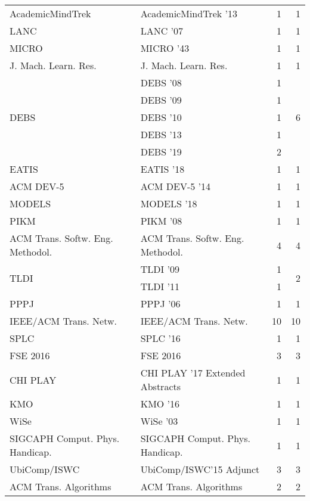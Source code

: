 \begin{table*}[t]
\begin{tabular}{llrr}
\multirow{1}{*}{AcademicMindTrek } & AcademicMindTrek '13 & 1 & \multirow{1}{*}{1}\\
\multirow{1}{*}{LANC } & LANC '07 & 1 & \multirow{1}{*}{1}\\
\multirow{1}{*}{MICRO } & MICRO '43 & 1 & \multirow{1}{*}{1}\\
\multirow{1}{*}{J. Mach. Learn. Res.} & J. Mach. Learn. Res. & 1 & \multirow{1}{*}{1}\\
\multirow{5}{*}{DEBS } & DEBS '08 & 1 & \multirow{5}{*}{6}\\
& DEBS '09 & 1 &\\
& DEBS '10 & 1 &\\
& DEBS '13 & 1 &\\
& DEBS '19 & 2 &\\
\multirow{1}{*}{EATIS } & EATIS '18 & 1 & \multirow{1}{*}{1}\\
\multirow{1}{*}{ACM DEV-5 } & ACM DEV-5 '14 & 1 & \multirow{1}{*}{1}\\
\multirow{1}{*}{MODELS } & MODELS '18 & 1 & \multirow{1}{*}{1}\\
\multirow{1}{*}{PIKM } & PIKM '08 & 1 & \multirow{1}{*}{1}\\
\multirow{1}{*}{ACM Trans. Softw. Eng. Methodol.} & ACM Trans. Softw. Eng. Methodol. & 4 & \multirow{1}{*}{4}\\
\multirow{2}{*}{TLDI } & TLDI '09 & 1 & \multirow{2}{*}{2}\\
& TLDI '11 & 1 &\\
\multirow{1}{*}{PPPJ } & PPPJ '06 & 1 & \multirow{1}{*}{1}\\
\multirow{1}{*}{IEEE/ACM Trans. Netw.} & IEEE/ACM Trans. Netw. & 10 & \multirow{1}{*}{10}\\
\multirow{1}{*}{SPLC } & SPLC '16 & 1 & \multirow{1}{*}{1}\\
\multirow{1}{*}{FSE 2016} & FSE 2016 & 3 & \multirow{1}{*}{3}\\
\multirow{1}{*}{CHI PLAY } & CHI PLAY '17 Extended Abstracts & 1 & \multirow{1}{*}{1}\\
\multirow{1}{*}{KMO } & KMO '16 & 1 & \multirow{1}{*}{1}\\
\multirow{1}{*}{WiSe } & WiSe '03 & 1 & \multirow{1}{*}{1}\\
\multirow{1}{*}{SIGCAPH Comput. Phys. Handicap.} & SIGCAPH Comput. Phys. Handicap. & 1 & \multirow{1}{*}{1}\\
\multirow{1}{*}{UbiComp/ISWC} & UbiComp/ISWC'15 Adjunct & 3 & \multirow{1}{*}{3}\\
\multirow{1}{*}{ACM Trans. Algorithms} & ACM Trans. Algorithms & 2 & \multirow{1}{*}{2}\\

\end{tabular}
\end{table*}
